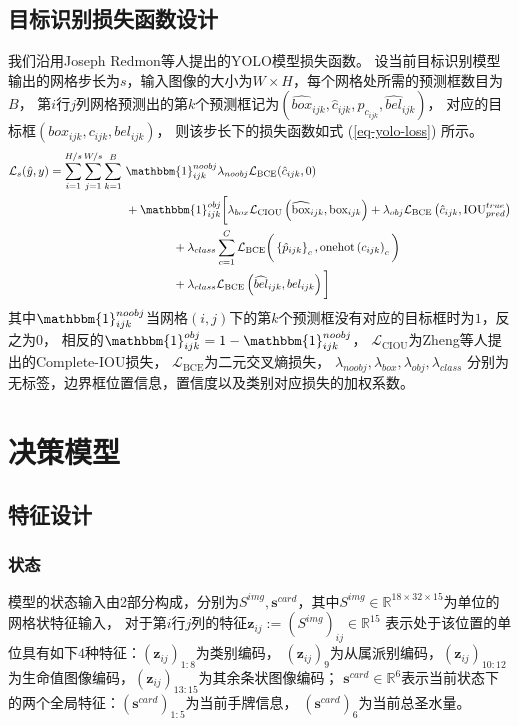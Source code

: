 \documentclass[openany,twoside,nofonts,AutoFakeBold,UTF8]{ctexbook}
\def\bd{\boldsymbol}        %
\begin{document}
\subsection{目标识别损失函数设计}
我们沿用Joseph Redmon等人\cite{YOLO}提出的YOLO模型损失函数。
设当前目标识别模型输出的网格步长为$s$，输入图像的大小为$W\times H$，每个网格处所需的预测框数目为$B$，
第$i$行$j$列网格预测出的第$k$个预测框记为$\left(\widehat{box}_{ijk},\hat{c}_{ijk}, \hat{p}_{c_{ijk}}, \widehat{bel}_{ijk}\right)$，
对应的目标框$\left(box_{ijk}, c_{ijk}, bel_{ijk}\right)$，\vspace{0.5ex}
则该步长下的损失函数如式 (\ref{eq-yolo-loss}) 所示。
\begin{equation}\label{eq-yolo-loss}
\begin{aligned}
\mathcal{L}_{s}(\hat{y}, y) = 
\sum_{i=1}^{H/s}\sum_{j=1}^{W/s}\sum_{k=1}^B&\ \mathbbm{1}^{noobj}_{ijk}\lambda_{noobj}\mathcal{L}_{\text{BCE}}(\hat{c}_{ijk},0)\\
&\ +\mathbbm{1}^{obj}_{ijk}\bigg[\lambda_{box}\mathcal{L}_{\text{CIOU}}\left(\widehat{\text{box}}_{ijk},\text{box}_{ijk}\right)+
\lambda_{obj}\mathcal{L}_{\text{BCE}}\left(\hat{c}_{ijk},\text{IOU}_{pred}^{true}\right)\\
&\ \qquad\qquad+\lambda_{class}\sum_{c=1}^{C}\mathcal{L}_{\text{BCE}}\bigg(\left\{\hat{p}_{ijk}\right\}_c, \text{onehot}\left(c_{ijk}\right)_c\bigg)\\
&\ \qquad\qquad+\lambda_{class}\mathcal{L}_{\text{BCE}}\left(\widehat{bel}_{ijk}, bel_{ijk}\right)\bigg]
\end{aligned}
\end{equation}
其中$\mathbbm{1}^{noobj}_{ijk}$当网格$(i,j)$下的第$k$个预测框没有对应的目标框时为$1$，反之为$0$，
相反的$\mathbbm{1}^{obj}_{ijk} = 1-\mathbbm{1}^{noobj}_{ijk}$，
$\mathcal{L}_{\text{CIOU}}$为Zheng等人\cite{CIOU}提出的Complete-IOU损失，
$\mathcal{L}_{\text{BCE}}$为二元交叉熵损失，
$\lambda_{noobj},\lambda_{box},\lambda_{obj},\lambda_{class}$
分别为无标签，边界框位置信息，置信度以及类别对应损失的加权系数。

\section{决策模型}\label{sec-decision-model}
\subsection{特征设计}
\subsubsection{状态}
模型的状态输入由2部分构成，分别为$S^{img}, \bd{s}^{card}$，其中$S^{img}\in\mathbb{R}^{18\times 32\times 15}$为单位的网格状特征输入，
对于第$i$行$j$列的特征$\bd{z}_{ij}:=(S^{img})_{ij}\in\mathbb{R}^{15}$
表示处于该位置的单位具有如下$4$种特征：$(\bd{z}_{ij})_{1:8}$为类别编码，
$(\bd{z}_{ij})_9$为从属派别编码，$(\bd{z}_{ij})_{10:12}$为生命值图像编码，$(\bd{z}_{ij})_{13:15}$为其余条状图像编码；
$\bd{s}^{card}\in\mathbb{R}^6$表示当前状态下的两个全局特征：$(\bd{s}^{card})_{1:5}$为当前手牌信息，
$(\bd{s}^{card})_6$为当前总圣水量。
\end{document}
